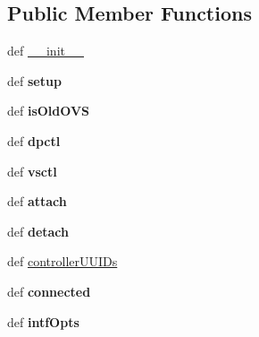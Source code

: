 \subsection*{Public Member Functions}
\begin{DoxyCompactItemize}
\item 
def \hyperlink{classmininet_1_1node_1_1OVSSwitch_ab5db2ef0d48302217833ce1538270310}{\-\_\-\-\_\-init\-\_\-\-\_\-}
\item 
\hypertarget{classmininet_1_1node_1_1OVSSwitch_a429a17cd26b37e4f7a58a1c9162120dc}{def {\bfseries setup}}\label{classmininet_1_1node_1_1OVSSwitch_a429a17cd26b37e4f7a58a1c9162120dc}

\item 
\hypertarget{classmininet_1_1node_1_1OVSSwitch_a81eeea1dc5162325ddbb2c07039b53de}{def {\bfseries is\-Old\-O\-V\-S}}\label{classmininet_1_1node_1_1OVSSwitch_a81eeea1dc5162325ddbb2c07039b53de}

\item 
\hypertarget{classmininet_1_1node_1_1OVSSwitch_a70306fa47e76fb9f4d3317dc88bf72ba}{def {\bfseries dpctl}}\label{classmininet_1_1node_1_1OVSSwitch_a70306fa47e76fb9f4d3317dc88bf72ba}

\item 
\hypertarget{classmininet_1_1node_1_1OVSSwitch_ae5eadfb6af415639ca3731e35563f661}{def {\bfseries vsctl}}\label{classmininet_1_1node_1_1OVSSwitch_ae5eadfb6af415639ca3731e35563f661}

\item 
\hypertarget{classmininet_1_1node_1_1OVSSwitch_aa3e0723a5b433fe03bbb4c39ab09c2c8}{def {\bfseries attach}}\label{classmininet_1_1node_1_1OVSSwitch_aa3e0723a5b433fe03bbb4c39ab09c2c8}

\item 
\hypertarget{classmininet_1_1node_1_1OVSSwitch_ab1cf861fc1db0a14244f650d0bb1aa93}{def {\bfseries detach}}\label{classmininet_1_1node_1_1OVSSwitch_ab1cf861fc1db0a14244f650d0bb1aa93}

\item 
def \hyperlink{classmininet_1_1node_1_1OVSSwitch_a14878a75c1db9c5aa4579471d0ece748}{controller\-U\-U\-I\-Ds}
\item 
\hypertarget{classmininet_1_1node_1_1OVSSwitch_abdc44068e907814e5aae52fef9ea4e3a}{def {\bfseries connected}}\label{classmininet_1_1node_1_1OVSSwitch_abdc44068e907814e5aae52fef9ea4e3a}

\item 
\hypertarget{classmininet_1_1node_1_1OVSSwitch_aaabdfd2c0413735604bba55bcef66dff}{def {\bfseries intf\-Opts}}\label{classmininet_1_1node_1_1OVSSwitch_aaabdfd2c0413735604bba55bcef66dff}


\end{DoxyCompactItemize}
